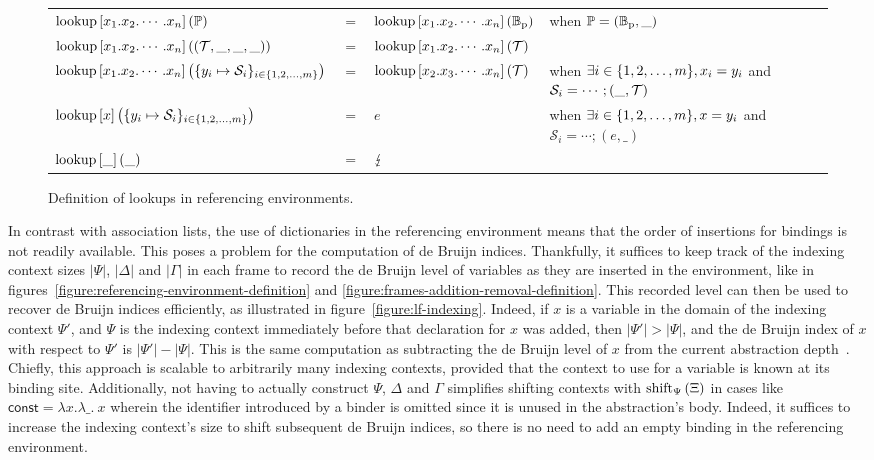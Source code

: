 \begin{figure}[H]
{{\begin{tabular}{lcl>{\raggedright\let\newline\\\arraybackslash\hspace{0pt}}p{5cm}}
$ \operatorname{lookup}\left[x_1.x_2.\cdots.x_n\right]\left(\mathbb{P}\right) $ & $ = $ & $ \operatorname{lookup}\left[x_1.x_2.\cdots.x_n\right]\left(\mathbb{B}_{\text{p}}\right) $ & when $ \mathbb{P} = (\mathbb{B}_{\text{p}}, \_) $\\
$ \operatorname{lookup}\left[x_1.x_2.\cdots.x_n\right]\left((\mathcal{T}, \_, \_, \_)\right) $ & $ = $ & $ \operatorname{lookup}\left[x_1.x_2.\cdots.x_n\right]\left(\mathcal{T}\right) $ &\\
$ \operatorname{lookup}\left[x_1.x_2.\cdots.x_n\right]\left(\{y_i \mapsto \mathcal{S}_i\}_{i \in \{1, 2, \dots, m\}}\right) $ & $ = $ & $ \operatorname{lookup}\left[x_2.x_3.\cdots.x_n\right]\left(\mathcal{T}\right) $ & when $ \exists i \in \{1, 2, \dots, m\}, x_i = y_i $ and $ \mathcal{S}_i = \cdots ; (\_, \mathcal{T}) $\\
$ \operatorname{lookup}\left[x\right]\left(\{y_i \mapsto \mathcal{S}_i\}_{i \in \{1, 2, \dots, m\}}\right) $ & $ = $ & $ e $ & when $ \exists i \in \{1, 2, \dots, m\}, x = y_i $ and $ \mathcal{S}_i = \cdots ; (e, \_) $\\
$ \operatorname{lookup}\left[\_\right]\left(\_\right) $ & $ = $ & $ \lightning $ &
\end{tabular}
}
}
\caption[Definition of lookups in referencing environments]{%
Definition of lookups in referencing environments.
}
\label{figure:lookup-definition}
\end{figure}

In contrast with association lists, the use of dictionaries in the referencing environment means that the order of insertions for bindings is not readily available.
This poses a problem for the computation of de Bruijn indices.
Thankfully, it suffices to keep track of the indexing context sizes $|\Psi|$, $|\Delta|$ and $|\Gamma|$ in each frame to record the de Bruijn level of variables as they are inserted in the environment, like in figures~\ref{figure:referencing-environment-definition} and \ref{figure:frames-addition-removal-definition}.
This recorded level can then be used to recover de Bruijn indices efficiently, as illustrated in figure~\ref{figure:lf-indexing}.
Indeed, if $x$ is a variable in the domain of the indexing context $\Psi'$, and $\Psi$ is the indexing context immediately before that declaration for $x$ was added, then $|\Psi'| > |\Psi|$, and the de Bruijn index of $x$ with respect to $\Psi'$ is $|\Psi'| - |\Psi|$.
This is the same computation as subtracting the de Bruijn level of $x$ from the current abstraction depth~\cite{DEBRUIJN1972381, debruijnlevels1995}.
Chiefly, this approach is scalable to arbitrarily many indexing contexts, provided that the context to use for a variable is known at its binding site.
Additionally, not having to actually construct $\Psi$, $\Delta$ and $\Gamma$ simplifies shifting contexts with $\operatorname{shift}_{\Psi}\left(\Xi\right)$ in cases like $\mathsf{const} = \lambda x.\lambda\_.\ x$ wherein the identifier introduced by a binder is omitted since it is unused in the abstraction's body.
Indeed, it suffices to increase the indexing context's size to shift subsequent de Bruijn indices, so there is no need to add an empty binding in the referencing environment.


